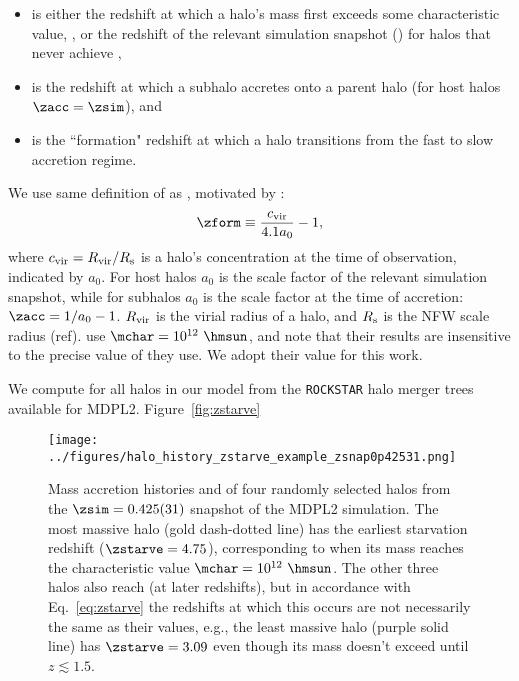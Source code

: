 \documentclass[twocolumn,apj,iop,tighten]{emulateapj2}
\begin{document}
\begin{itemize}
\item \zchar is either the redshift at which a halo's mass first exceeds some characteristic value, \mchar, or the redshift of the relevant simulation snapshot (\zsim) for halos that never achieve \mchar,
%
\item \zacc is the redshift at which a subhalo accretes onto a parent halo (for host halos ${\zacc=\zsim}$), and
%
\item \zform is the ``formation" redshift at which a halo transitions from the fast to slow accretion regime.
\end{itemize}
\noindent We use same definition of \zform as \citet{hearin_watson13}, motivated by \citet{wechsler_etal02}:
%
\begin{equation}\label{eq:zform}
\zform \equiv \frac{c_{\rm vir}}{4.1 a_0} - 1,
\end{equation}
%
\noindent where ${c_{\rm vir} = R_{\rm vir}/R_{\rm s}}$ is a halo's concentration at the time of observation, indicated by $a_0$. For host halos $a_0$ is the scale factor of the relevant simulation snapshot, while for subhalos $a_0$ is the scale factor at the time of accretion: ${\zacc = 1/{a_0} - 1}$. $R_{\rm vir}$ is the virial radius of a halo, and $R_{\rm s}$ is the NFW scale radius (ref). \citet{hearin_watson13} use ${\mchar=10^{12}\ \hmsun}$, and note that their results are insensitive to the precise value of \mchar they use. We adopt their value for this work.

We compute \zstarve for all halos in our model from the \texttt{ROCKSTAR} halo merger trees available for MDPL2. Figure~\ref{fig:zstarve}

\begin{figure}
\centering
\texttt{[image: ../figures/halo\_history\_zstarve\_example\_zsnap0p42531.png]}
\caption{Mass accretion histories and \zstarve of four randomly selected halos from the $\zsim=0.425(31)$ snapshot of the MDPL2 simulation. The most massive halo (gold dash-dotted line) has the earliest starvation redshift ($\zstarve=4.75$), corresponding to when its mass reaches the characteristic value ${\mchar=10^{12}\ \hmsun}$. The other three halos also reach \mchar (at later redshifts), but in accordance with Eq.~\ref{eq:zstarve} the redshifts at which this occurs are not necessarily the same as their \zstarve values, e.g., the least massive halo (purple solid line) has $\zstarve=3.09$ even though its mass doesn't exceed \mchar until $z\lesssim1.5$.
}
\label{fig:zstarve_example}
\end{figure}
\end{document}
